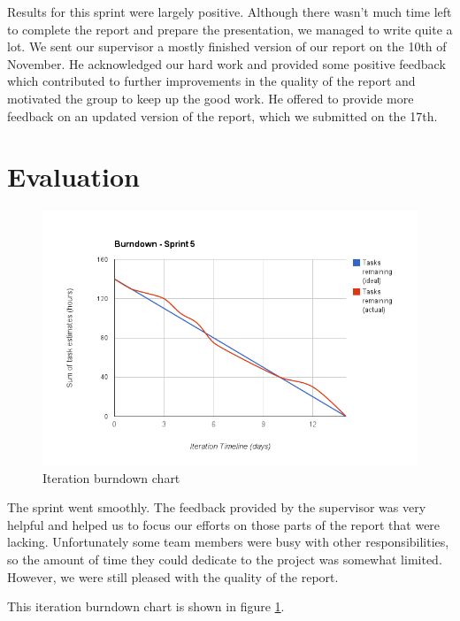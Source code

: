 Results for this sprint were largely positive. 
Although there wasn't much time left to complete the report and prepare the presentation, we managed to write quite a lot. 
We sent our supervisor a mostly finished version of our report on the 10th of November. 
He acknowledged our hard work and provided some positive feedback which contributed to further improvements in the quality of the report and motivated the group to keep up the good work. 
He offered to provide more feedback on an updated version of the report, which we submitted on the 17th.

\section{Evaluation}

\begin{figure}
\centering
\includegraphics[scale=0.60]{../Figures/burndownSprint5.png}
\caption{Iteration burndown chart}
\label{figure:burndownsprint5}
\end{figure}

The sprint went smoothly. 
The feedback provided by the supervisor was very helpful and helped us to focus our efforts on those parts of the report that were lacking.
Unfortunately some team members were busy with other responsibilities, so the amount of time they could dedicate to the project was somewhat limited.
However, we were still pleased with the quality of the report.

This iteration burndown chart is shown in figure \ref{figure:burndownsprint5}.


